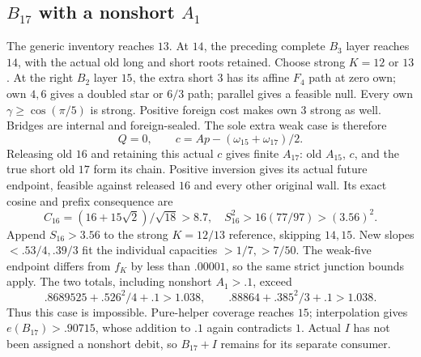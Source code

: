 \documentclass[11pt]{article}
\theoremstyle{definition}
\theoremstyle{remark}
\begin{document}
\subsection{\(B_{17}\) with a nonshort \(A_1\)}
The generic inventory reaches \(13\).
At \(14\), the preceding complete \(B_3\)
layer reaches \(14\), with the actual
old long and short roots retained.
Choose strong \(K=12\) or \(13\).
At the right \(B_2\) layer \(15\), the
extra short \(3\) has its affine \(F_4\)
path at zero own; own \(4,6\) gives
a doubled star or \(6/3\) path;
parallel gives a feasible null.
Every own \(\gamma\geq\cos(\pi/5)\)
is strong. Positive foreign cost makes
own \(3\) strong as well.
Bridges are internal and foreign-sealed.
The sole extra weak case is therefore
\[
 Q=0,\qquad c=A p-(\omega_{15}+\omega_{17})/2.
\]
Releasing old \(16\) and retaining this
actual \(c\) gives finite \(A_{17}\):
old \(A_{15}\), \(c\), and the true
short old \(17\) form its chain.
Positive inversion gives its actual
future endpoint, feasible against released
\(16\) and every other original wall.
Its exact cosine and prefix consequence are
\[
 C_{16}=(16+15\sqrt2)/\sqrt{18}>8.7,\quad
 S_{16}^2>16(77/97)>(3.56)^2.
\]
Append \(S_{16}>3.56\) to the strong
\(K=12/13\) reference, skipping \(14,15\).
New slopes \(<.53/4,.39/3\) fit the
individual capacities \(>1/7,>7/50\).
The weak-five endpoint differs from
\(f_K\) by less than \(.00001\), so the
same strict junction bounds apply.
The two totals, including nonshort \(A_1>.1\),
exceed
\[
 .8689525+.526^2/4+.1>1.038,\qquad
 .88864+.385^2/3+.1>1.038.
\]
Thus this case is impossible.
Pure-helper coverage reaches \(15\);
interpolation gives \(e(B_{17})>.90715\),
whose addition to \(.1\) again contradicts \(1\).
Actual \(I\) has not been assigned a
nonshort debit, so \(B_{17}+I\) remains
for its separate consumer.


\end{document}
